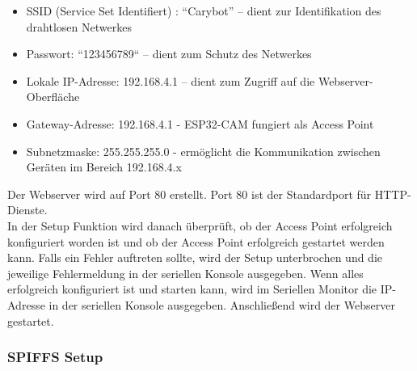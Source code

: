 \documentclass[ngerman,12pt,a4paper]{article}
\begin{document}
	\begin{itemize}
		\item SSID (Service Set Identifiert) : “Carybot” – dient zur Identifikation des drahtlosen Netwerkes
		\item Passwort: “123456789“ – dient zum Schutz des Netwerkes
		\item Lokale IP-Adresse: 192.168.4.1 – dient zum Zugriff auf die Webserver-Oberfläche
		\item Gateway-Adresse: 192.168.4.1 - ESP32-CAM fungiert als Access Point
		\item Subnetzmaske: 255.255.255.0 - ermöglicht die Kommunikation zwischen Geräten im Bereich 192.168.4.x
	\end{itemize} 
	Der Webserver wird auf Port 80 erstellt. Port 80 ist der Standardport für HTTP-Dienste. 
	\\[0.5cm]
	In der Setup Funktion wird danach überprüft, ob der Access Point erfolgreich konfiguriert worden ist und ob der Access Point erfolgreich gestartet werden kann. Falls ein Fehler auftreten sollte, wird der Setup unterbrochen und die jeweilige Fehlermeldung in der seriellen Konsole ausgegeben. Wenn alles erfolgreich konfiguriert ist und starten kann, wird im Seriellen Monitor die IP-Adresse in der seriellen Konsole ausgegeben. Anschließend wird der Webserver gestartet.
			
			\subsubsection{SPIFFS Setup}
			
\end{document}
